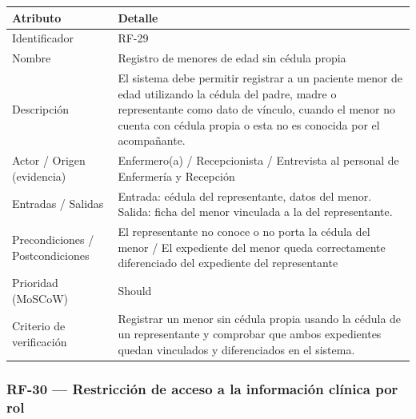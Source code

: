 \documentclass[11pt,a4paper]{article}
\begin{document}
	\begin{longtable}{p{} p{}}
		
		\toprule
		\textbf{Atributo} & \textbf{Detalle} \\
		\midrule
		\endhead
		
		Identificador & RF-29 \\
		Nombre & Registro de menores de edad sin cédula propia \\
		Descripción & El sistema debe permitir registrar a un paciente menor de edad utilizando la cédula del padre, madre o representante como dato de vínculo, cuando el menor no cuenta con cédula propia o esta no es conocida por el acompañante. \\
		Actor / Origen (evidencia) & Enfermero(a) / Recepcionista / Entrevista al personal de Enfermería y Recepción \\
		Entradas / Salidas & Entrada: cédula del representante, datos del menor. Salida: ficha del menor vinculada a la del representante. \\
		Precondiciones / Postcondiciones & El representante no conoce o no porta la cédula del menor / El expediente del menor queda correctamente diferenciado del expediente del representante \\
		Prioridad (MoSCoW) & Should \\
		Criterio de verificación & Registrar un menor sin cédula propia usando la cédula de un representante y comprobar que ambos expedientes quedan vinculados y diferenciados en el sistema. \\
		\bottomrule
	\end{longtable}
	
	\subsubsection{RF-30 --- Restricción de acceso a la información clínica por rol}
	
\end{document}
